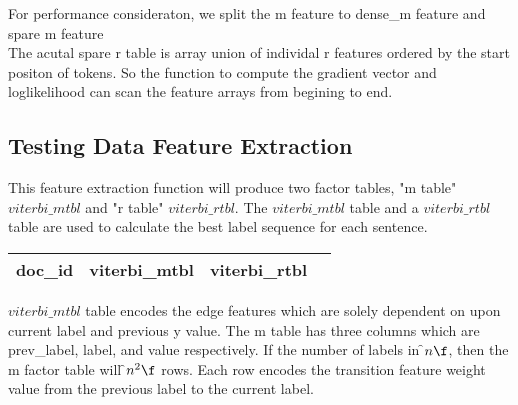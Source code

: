 For performance consideraton, we split the m feature to dense\_m feature and spare m feature\\
The acutal spare r table is array union of individal r features ordered by the start positon of tokens.
So the function to compute the gradient vector and loglikelihood can scan the feature arrays from begining to end.

\subsection{Testing Data Feature Extraction}
  This feature extraction function will produce two factor tables, "m table"
  $viterbi\_mtbl$ and "r table" $viterbi\_rtbl$. The $viterbi\_mtbl$
  table and a $viterbi\_rtbl$ table are used to calculate the best label
  sequence for each sentence.

\begin{center}
    \begin{tabular}{ | l | l | l | l |}
    \hline
    doc\_id & viterbi\_mtbl & viterbi\_rtbl \\ 
    \hline
    \end{tabular}
\end{center}
 
  $viterbi\_mtbl$ table
  encodes the edge features which are solely dependent on upon current label and
  previous y value. The m table has three columns which are prev\_label, label,
  and value respectively.
  If the number of labels in \f$ n \f$, then the m factor table will \f$ n^2 \f$
  rows. Each row encodes the transition feature weight value from the previous label
  to the current label.
 
